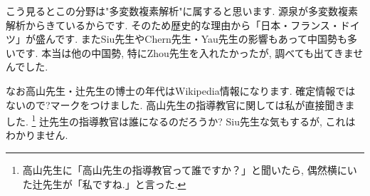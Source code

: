 こう見るとこの分野は"多変数複素解析"に属すると思います. 源泉が多変数複素解析からきているからです.
そのため歴史的な理由から「日本・フランス・ドイツ」が盛んです. 
またSiu先生やChern先生・Yau先生の影響もあって中国勢も多いです. 
本当は他の中国勢, 特にZhou先生を入れたかったが, 調べても出てきませんでした.  


なお高山先生・辻先生の博士の年代はWikipedia情報になります. 
確定情報ではないので?マークをつけました. 高山先生の指導教官に関しては私が直接聞きました. \footnote{高山先生に「高山先生の指導教官って誰ですか？」と聞いたら, 偶然横にいた辻先生が「私ですね.」と言った.} 辻先生の指導教官は誰になるのだろうか? Siu先生な気もするが, これはわかりません. 

\newpage

